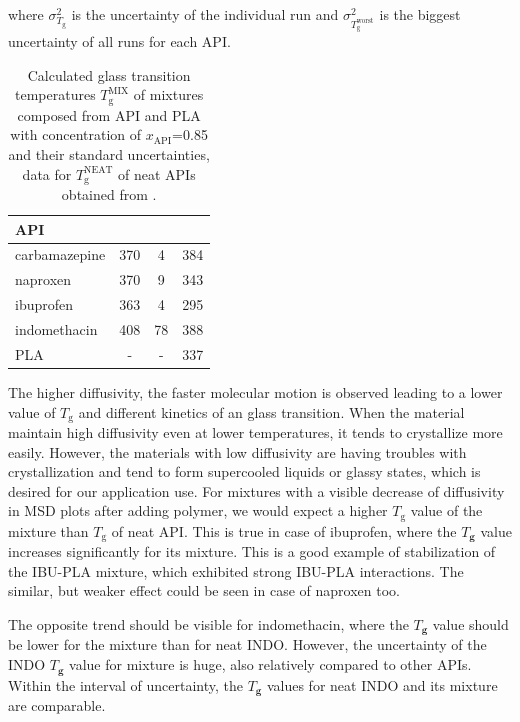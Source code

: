 where $\sigma_{T_{\text{g}}^\text{}}^2$ is the uncertainty of the individual run and  $\sigma_{T_{\text{g}}^\text{worst}}^2$ is the biggest uncertainty of all runs for each API.

\begin{table}[htb!]
	\caption{Calculated glass transition temperatures $T_\text{g}^\text{MIX}$ of mixtures composed from API and PLA with concentration of $x_\text{API}$=0.85 and their standard uncertainties, data for $T_\text{g}^\text{NEAT}$ of neat APIs obtained from \cite{cervinka_structure_2021}.}
	\centering
	\begin{tabular}{lccc} \toprule
		{\textbf{API}} & {\textbf{\boldmath{$T_{\text{g}}^\text{MIX}$}}} & \textbf{{\boldmath{$\sigma_{T_{\text{g}}^\text{MIX}}$}}} &
		\textbf{\boldmath{$T_{\text{g}}^\text{NEAT}$}}\\
		\midrule
		carbamazepine  & 370 & 4 & 384\\		
		naproxen   & 370 & 9 & 343\\
		ibuprofen  & 363 & 4 & 295\\
		indomethacin  & 408 & 78 & 388\\
		PLA & - & - & 337\\
		\bottomrule
	\end{tabular}
	\label{tab:Tg_mix} 
\end{table} 


The higher diffusivity, the faster molecular motion is observed leading to a lower value of $T_\text{g}$ and different kinetics of an glass transition. When the material maintain high diffusivity even at lower temperatures, it tends to crystallize more easily. However, the materials with low diffusivity are having troubles with crystallization and tend to form supercooled liquids or glassy states, which is desired for our application use. For mixtures with a visible decrease of diffusivity in MSD plots after adding polymer, we would expect a higher $T_\text{g}$ value of the mixture than $T_\text{g}$ of neat API. This is true in case of ibuprofen, where the $T_\textbf{g}$ value increases significantly for its mixture. This is a good example of stabilization of the IBU-PLA mixture, which exhibited strong IBU-PLA interactions. The similar, but weaker effect could be seen in case of naproxen too.

The opposite trend should be visible for indomethacin, where the $T_\textbf{g}$ value should be lower for the mixture than for neat INDO. However, the uncertainty of the INDO $T_\textbf{g}$ value for mixture is huge, also relatively compared to other APIs. Within the interval of uncertainty, the $T_\textbf{g}$ values for neat INDO and its mixture are comparable. 

